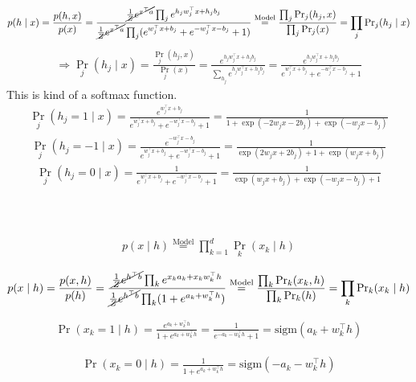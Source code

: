 \documentclass[a4paper]{article}
\newcommand{\1}{\mathds{1}}
\newcommand{\sigm}{\text{sigm}}
\begin{document}
\begin{gather*}
	p(h \mid x) = {p(h, x) \over p(x)} 
	= 
	\frac{\cancel{{1\over Z} e^{x^\top a}}\prod_j e^{h_jw_j^\top x + h_j b_j} }
	{\cancel{{1\over Z} e^{x^\top a}}\prod_j (e^{w_j^\top x + b_j} + e^{-w_j^\top x - b_j} + 1)}
	\stackrel{\text{Model}}{=}
	\frac{\prod_j {\Pr}_j(h_j, x)}{\prod_j {\Pr}_j(x)}
	=
	\prod_j {\Pr}_j(h_j \mid x)
\end{gather*}
\begin{gather*}
	\Longrightarrow
	{\Pr}_j(h_j \mid x)
	=
	\frac{{\Pr}_j(h_j, x)}{{\Pr}_j(x)}
	=
	\frac{e^{h_jw^\top_jx + h_jb_j}} {\sum_{h_j} e^{h_jw^\top_jx + h_jb_j}}
	=
	\frac{e^{h_jw_j^\top x + h_j b_j} }
	{e^{w_j^\top x + b_j} + e^{-w_j^\top x - b_j} + 1}
\end{gather*}
This is kind of a softmax function.
\begin{gather*}
	{\Pr}_j(h_j = 1 \mid x)  
	= 
	\frac{e^{w_j^\top x + b_j} }
	{e^{w_j^\top x + b_j} + e^{-w_j^\top x - b_j} + 1}
	=
	\frac{1}{1 + \exp(-2w_jx - 2b_j) + \exp(-w_jx - b_j)} 
\end{gather*}
\begin{gather*}
	{\Pr}_j(h_j = -1 \mid x) 
	= 
	\frac{e^{-w_j^\top x - b_j} }
	{e^{w_j^\top x + b_j} + e^{-w_j^\top x - b_j} + 1}
	=
	\frac{1}{\exp(2w_jx + 2b_j) + 1 + \exp(w_jx + b_j)} 
\end{gather*}
\begin{gather*}
	{\Pr}_j(h_j = 0 \mid x)  
	= 
	\frac{1 }
	{e^{w_j^\top x + b_j} + e^{-w_j^\top x - b_j} + 1}
	=
	\frac{1}{\exp(w_jx + b_j) +  \exp(-w_jx - b_j) + 1 }
\end{gather*}
\\
\\
\\
\begin{gather*}
	p(x \mid h) \stackrel{\text{Model}}{=} \prod_{k=1}^d {\Pr}_k(x_k \mid h)  
\end{gather*}

\begin{gather*}
	p(x \mid h) = {p(x, h) \over p(h)} 
	= 
	\frac{\cancel{{1\over Z} e^{h^\top b}}\prod_k e^{x_ka_k + x_kw_k^\top h} }
	{\cancel{{1\over Z} e^{h^\top b}}\prod_k (1 + e^{a_k + w_k^\top h})}
	\stackrel{\text{Model}}{=}
	\frac{\prod_k {\Pr}_k(x_k, h)}{\prod_k {\Pr}_k(h)}
	=
	\prod_k {\Pr}_k(x_k \mid h)
\end{gather*}


\begin{gather*}
	\Pr(x_k = 1 \mid h) 
	=
	 \frac{e^{a_k + w_k^\top h} }
	{1 + e^{a_k + w_k^\top h}}
	=
	\frac{1}
	{e^{-a_k - w_k^\top h} + 1}
	= 
	\sigm(a_k + w_k^\top h)
\end{gather*}

\begin{gather*}
	\Pr(x_k = 0 \mid h) 
	=
	 \frac{1}
	{1 + e^{a_k + w_k^\top h}}
	=
	\sigm(- a_k - w_k^\top h)
\end{gather*}
\end{document}
